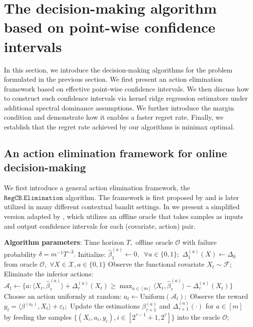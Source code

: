 \documentclass[mnsc]{informs3aa} %
\renewcommand{\hat}{\widehat}
\newcommand{\mA}{\mathcal A}
\newcommand{\mF}{\mathcal F}
\renewcommand{\hat}{\widehat}
\renewcommand{\hat}{\widehat}
\newcommand{\mO}{\mathcal O}
\newcommand{\mX}{\mathcal X}
\begin{document}
\section{The decision-making algorithm based on point-wise confidence intervals}
In this section, we introduce the decision-making algorithms for the problem formulated in the previous section. We first present an action elimination framework based on effective point-wise confidence intervals. We then discuss how to construct such confidence intervals via kernel ridge regression estimators under additional spectral dominance assumptions. We further introduce the margin condition and demonstrate how it enables a faster regret rate. Finally, we establish that the regret rate achieved by our algorithms is minimax optimal.
\subsection{An action elimination framework for online decision-making}
We first introduce a general action elimination framework, the \(\mathtt{RegCB.Elimination}\) algorithm.  The framework is first proposed by \cite{foster2018practical} and is later utilized in many different contextual bandit settings. In  we present a simplified version adapted by \cite{li2024optimal}, which utilizes an offline oracle that takes samples as inputs and output confidence intervals for each (covariate, action) pair. 
	\begin{algorithm}[h]
	\caption{The action elimination with offline oracle (\(\mathtt{RegCB.Elimination}\))}
	\label{alg:elim}
	\begin{algorithmic}[1]
\State \textbf{Algorithm parameters}: Time horizon $T,$ offline oracle $\mO$ with failure probability \(\delta=m^{-1}T^{-3}.\)
\State Initialize: \(\hat \beta^{(a)}_1\gets 0,\;\;\forall a\in\{0,1\};\) \(\Delta^{(a)}_1(X)\gets \Delta_0\) from oracle $\mO,$ \(\forall X\in\mX,a\in\{0,1\}\) 
\State Observe the functional covariate $X_t\sim\mF;$
\State Eliminate the inferior actions: \(\mA_t \gets \{a:\langle X_t,\hat\beta^{(a)}_\tau\rangle+\Delta^{(a)}_\tau(X_t)\geq \max_{a\in[m]}\langle X_t,\hat\beta^{(a)}_\tau\rangle-\Delta^{(a)}_\tau(X_t)\}\)
\State Choose an action uniformly at random: \(a_t\gets \mathrm{Uniform}(\mA_t);\)
\State Observe the reward $y_t=\langle \beta^{(a_t)}, X_t\rangle+\varepsilon_t;$
\EndFor
\State Update the estimations $\beta^{(a)}_{\tau+1}$ and $\Delta_{\tau+1}^{(a)}(\cdot)$ for $a\in[m]$ by feeding the samples $\{(X_i,a_i,y_i),i\in[2^{\tau-1}+1, 2^\tau]\}$ into the oracle $\mO;$
\EndFor
	\end{algorithmic}
\end{algorithm}
\end{document}
